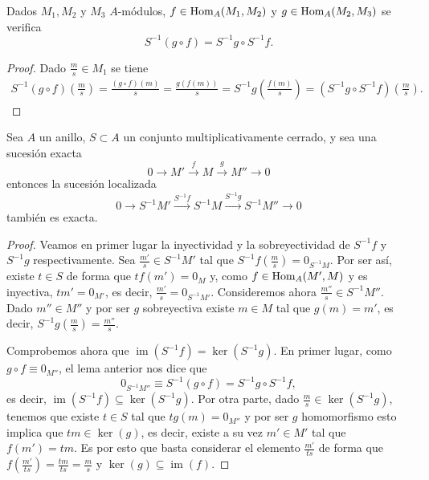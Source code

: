 \documentclass[../main.tex]{subfiles}
\begin{document}
	\begin{lemma}
		Dados $M_1, M_2$ y $M_3$ $A$-módulos, $f\in\text{Hom}_A(M_1,M_2)$ y $g\in\text{Hom}_A(M_2,M_3)$ se verifica
		$$S^{-1}(g\circ f)=S^{-1}g\circ S^{-1}f.$$
	\end{lemma}

	\begin{proof}
		Dado $\frac{m}{s}\in M_1$ se tiene
		\begin{align*}
		S^{-1}(g\circ f)\left(\frac{m}{s}\right)=\frac{(g\circ f)(m)}{s}=\frac{g(f(m))}{s}=S^{-1}{g}\left(\frac{f(m)}{s}\right)=(S^{-1}{g}\circ S^{-1}{f})\left(\frac{m}{s}\right).
		\end{align*}
	\end{proof}

	\begin{proposition}
		Sea $A$ un anillo, $S\subset A$ un conjunto multiplicativamente cerrado, y sea una sucesión exacta $$0 \longrightarrow M'\overset{f}{\longrightarrow}M\overset{g}{\longrightarrow}M'' \longrightarrow 0$$ entonces la sucesión localizada  $$0\longrightarrow S^{-1}M'\overset{S^{-1}f}{\longrightarrow}S^{-1}M\overset{S^{-1}g}{\longrightarrow}S^{-1}M''\longrightarrow 0$$ también es exacta.
	\end{proposition}

	\begin{proof}
		Veamos en primer lugar la inyectividad y la sobreyectividad de $S^{-1}f$ y $S^{-1}g$ respectivamente. Sea $\frac{m'}{s}\in S^{-1}M'$ tal que $S^{-1}f\left(\frac{m}{s}\right)=0_{S^{-1}M}$. Por ser así, existe $t\in S$ de forma que $tf(m')=0_M$ y, como $f\in\text{Hom}_A(M',M)$ y es inyectiva, $tm'=0_{M'}$, es decir, $\frac{m'}{s}=0_{S^{-1}M'}$.
		Consideremos ahora $\frac{m''}{s}\in S^{-1}M''$. Dado $m''\in M''$ y por ser $g$ sobreyectiva existe $m\in M$ tal que $g(m)=m'$, es decir, $S^{-1}g\left(\frac{m}{s}\right)=\frac{m''}{s}$.

		Comprobemos ahora que $\operatorname{im}(S^{-1}f)=\ker (S^{-1}g)$. En primer lugar, como $g\circ f\equiv 0_{M''}$, el lema anterior nos dice que
		$$0_{S^{-1} M''}\equiv S^{-1}(g\circ f)=S^{-1} g\circ S^{-1} f,$$
		es decir, $\operatorname{im} (S^{-1}f)\subseteq \ker(S^{-1}g)$. Por otra parte, dado $\frac{m}{s}\in\ker(S^{-1}g)$, tenemos que existe $t\in S$ tal que $tg(m)=0_{M''}$ y por ser $g$ homomorfismo esto implica que $tm\in\ker(g)$, es decir, existe a su vez $m'\in M'$ tal que $f(m')=tm$. Es por esto que basta considerar el elemento $\frac{m'}{ts}$ de forma que $f(\frac{m'}{ts})=\frac{tm}{ts}=\frac{m}{s}$ y $\ker(g)\subseteq\operatorname{im}(f)$.
	\end{proof}
\end{document}
